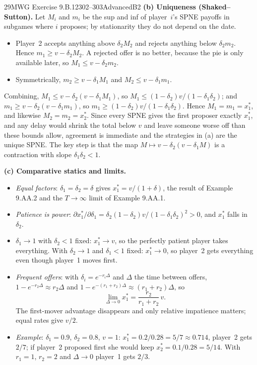 \begin{exsol}{29}{MWG Exercise 9.B.12}{302--303}{Advanced}{B2}
\textbf{(b) Uniqueness (Shaked--Sutton).} Let $M_i$ and $m_i$ be the sup and inf of player~$i$'s
SPNE payoffs in subgames where $i$ proposes; by stationarity they do not depend on the date.
\begin{itemize}
  \item Player~2 accepts anything above $\delta_2 M_2$ and rejects anything below $\delta_2 m_2$.
  Hence $m_1 \ge v - \delta_2 M_2$. A rejected offer is no better, because the pie is only
  available later, so $M_1 \le v - \delta_2 m_2$.
  \item Symmetrically, $m_2 \ge v - \delta_1 M_1$ and $M_2 \le v - \delta_1 m_1$.
\end{itemize}
Combining, $M_1 \le v - \delta_2(v - \delta_1 M_1)$, so $M_1 \le (1-\delta_2)v/(1 - \delta_1\delta_2)$;
and $m_1 \ge v - \delta_2(v - \delta_1 m_1)$, so $m_1 \ge (1-\delta_2)v/(1-\delta_1\delta_2)$. Hence
$M_1 = m_1 = x_1^*$, and likewise $M_2 = m_2 = x_2^*$. Since every SPNE gives the first proposer
exactly $x_1^*$, and any delay would shrink the total below $v$ and leave someone worse off than
these bounds allow, agreement is immediate and the strategies in (a) are the unique SPNE. The
key step is that the map $M \mapsto v - \delta_2(v - \delta_1 M)$ is a contraction with slope
$\delta_1\delta_2 < 1$.

\textbf{(c) Comparative statics and limits.}
\begin{itemize}
  \item \emph{Equal factors}: $\delta_1 = \delta_2 = \delta$ gives $x_1^* = v/(1+\delta)$, the
  result of Example 9.AA.2 and the $T \to \infty$ limit of Example 9.AA.1.
  \item \emph{Patience is power}: $\partial x_1^*/\partial\delta_1 =
  \delta_2(1-\delta_2)v/(1-\delta_1\delta_2)^2 > 0$, and $x_1^*$ falls in $\delta_2$.
  \item $\delta_1 \to 1$ with $\delta_2 < 1$ fixed: $x_1^* \to v$, so the perfectly patient
  player takes everything. With $\delta_2 \to 1$ and $\delta_1 < 1$ fixed: $x_1^* \to 0$, so
  player~2 gets everything even though player~1 moves first.
  \item \emph{Frequent offers}: with $\delta_i = e^{-r_i\Delta}$ and $\Delta$ the time between
  offers, $1 - e^{-r_2\Delta} \approx r_2\Delta$ and $1 - e^{-(r_1+r_2)\Delta} \approx
  (r_1+r_2)\Delta$, so
  \[
    \lim_{\Delta \to 0} x_1^* = \frac{r_2}{r_1 + r_2}\,v .
  \]
  The first-mover advantage disappears and only relative impatience matters; equal rates give
  $v/2$.
  \item \emph{Example}: $\delta_1 = 0.9$, $\delta_2 = 0.8$, $v = 1$: $x_1^* = 0.2/0.28 = 5/7
  \approx 0.714$, player~2 gets $2/7$; if player~2 proposed first she would keep
  $x_2^* = 0.1/0.28 = 5/14$. With $r_1 = 1$, $r_2 = 2$ and $\Delta \to 0$ player~1 gets $2/3$.
\end{itemize}


\end{exsol}
